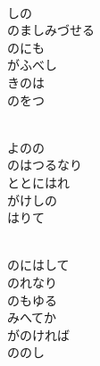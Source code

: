 \documentclass[10pt,b5j]{tarticle} %
\begin{document}
\vspace{1.5em} %
\newcommand{\linespace}{0.5em} %
\newcommand{\blocksize}{0.5\hsize} %
\newcommand{\itemmargin}{6em} %
\begin{enumerate} %
    \setlength{\itemindent}{\itemmargin} %
    \begin{minipage}[c]{\blocksize}
    
        \vspace{\linespace}
        \item~\\
        しの\\
        のましみづせる\\
        のにも\\
        がふべし\\
        きのは\\
        のをつ
        
        \vspace{\linespace}
        \item~\\
        よのの\\
        のはつるなり\\
        ととにはれ\\
        がけしの\\
        はりて
        
        \vspace{\linespace}
        \item~\\
        のにはして\\
        のれなり\\
        のもゆる\\
        みへてか\\
        がのければ\\
        ののし
        

\end{minipage}
\end{enumerate}
\end{document}
